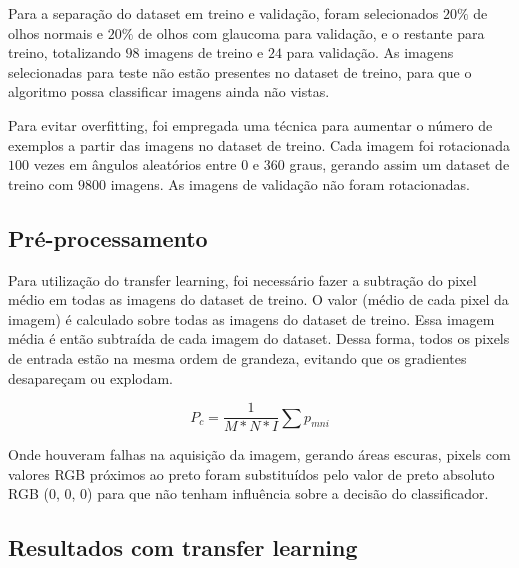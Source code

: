 \documentclass[conference]{IEEEtran}
\begin{document}
  Para a separação do dataset em treino e validação, foram selecionados $20\%$ de olhos normais e $20\%$ de olhos com glaucoma para validação, e o restante para treino, totalizando $98$ imagens de treino e $24$ para validação. As imagens selecionadas para teste não estão presentes no dataset de treino, para que o algoritmo possa classificar imagens ainda não vistas.

  Para evitar overfitting, foi empregada uma técnica para aumentar o número de exemplos a partir das imagens no dataset de treino. Cada imagem foi rotacionada $100$ vezes em ângulos aleatórios entre $0$ e $360$ graus, gerando assim um dataset de treino com $9800$ imagens. As imagens de validação não foram rotacionadas.

  \subsection{Pré-processamento}


  
  
  Para utilização do transfer learning, foi necessário fazer a subtração do pixel médio em todas as imagens do dataset de treino. O valor (médio de cada pixel da imagem) é calculado sobre todas as imagens do dataset de treino. Essa imagem média é então subtraída de cada imagem do dataset. Dessa forma, todos os pixels de entrada estão na mesma ordem de grandeza, evitando que os gradientes desapareçam ou explodam.

  \begin{equation}
    P_c = \frac{1}{M * N * I} \sum p_{mni}
    \label{eq:learning_rate}
  \end{equation}

  Onde houveram falhas na aquisição da imagem, gerando áreas escuras, pixels com valores RGB próximos ao preto foram substituídos pelo valor de preto absoluto RGB (0, 0, 0) para que não tenham influência sobre a decisão do classificador.

  \subsection{Resultados com transfer learning}

\end{document}
